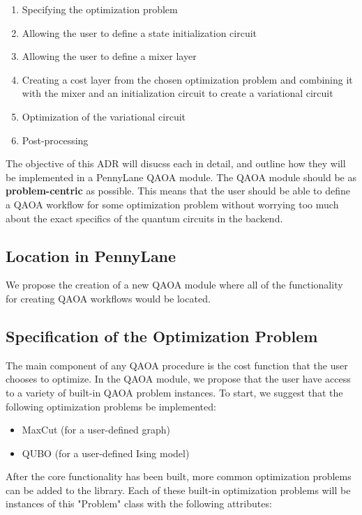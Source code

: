 \documentclass{article}
\begin{document}
\begin{enumerate}
	\item Specifying the optimization problem
	\item Allowing the user to define a state initialization circuit
	\item Allowing the user to define a mixer layer
	\item Creating a cost layer from the chosen optimization problem and combining it with the mixer and an initialization circuit 
	      to create a variational circuit
      	\item Optimization of the variational circuit
	\item Post-processing
\end{enumerate}
\noindent
The objective of this ADR will disucss each in detail, and outline how they will be implemented in 
a PennyLane QAOA module.
\newline\newline
The QAOA module should be as \textbf{problem-centric} as possible. This means that 
the user should be able to define a QAOA workflow for some optimization problem without 
worrying too much about the exact specifics of the quantum circuits in the backend.

\subsection{Location in PennyLane}

We propose the creation of a new QAOA module where all of the functionality 
for creating QAOA workflows would be located.

\subsection{Specification of the Optimization Problem}

The main component of any QAOA procedure is the cost function that the user 
chooses to optimize. In the QAOA module, we propose that the user have 
access to a variety of built-in QAOA problem instances.
To start, we suggest that the following optimization problems be implemented:

 \begin{itemize}
	 \item MaxCut (for a user-defined graph)
	 \item QUBO (for a user-defined Ising model)
\end{itemize}

After the core functionality has been built, more common optimization problems can be added 
to the library.
\newline\newline
\noindent
Each of these built-in optimization problems will
be instances of this "Problem" class with the following attributes:
\end{document}
